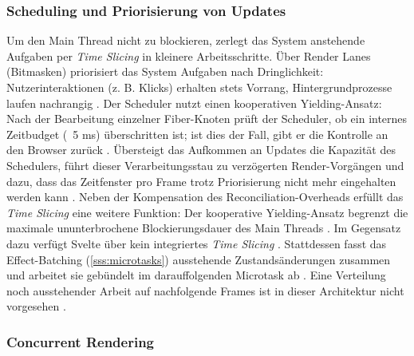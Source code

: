 \subsubsection{Scheduling und Priorisierung von Updates}
\label{sss:scheduling-priotising-of-updates}

Um den Main Thread nicht zu blockieren, zerlegt das System anstehende Aufgaben per \textit{Time Slicing} in kleinere Arbeitsschritte. Über Render Lanes (Bitmasken) priorisiert das System Aufgaben nach Dringlichkeit: Nutzerinteraktionen (z. B. Klicks) erhalten stets Vorrang, Hintergrundprozesse laufen nachrangig \cite{kumar-fluentreact-2024}. Der Scheduler nutzt einen kooperativen Yielding-Ansatz: Nach der Bearbeitung einzelner Fiber-Knoten prüft der Scheduler, ob ein internes Zeitbudget (~5 ms) überschritten ist; ist dies der Fall, gibt er die Kontrolle an den Browser zurück \cite{dev_fiber-2025}. Übersteigt das Aufkommen an Updates die Kapazität des Schedulers, führt dieser Verarbeitungsstau zu verzögerten Render-Vorgängen und dazu, dass das Zeitfenster pro Frame trotz Priorisierung nicht mehr eingehalten werden kann \cite{sitepoint_fiber-2026}. Neben der Kompensation des Reconciliation-Overheads erfüllt das \textit{Time Slicing} eine weitere Funktion: Der kooperative Yielding-Ansatz begrenzt die maximale ununterbrochene Blockierungsdauer des Main Threads \cite{github-reactfiber-2016, react_concurrentrendering-2022}. Im Gegensatz dazu verfügt Svelte über kein integriertes \textit{Time Slicing} \cite{github-reactfiber-2016, medium-microtasks-2021}. Stattdessen fasst das Effect-Batching (\cref{sss:microtasks}) ausstehende Zustandsänderungen zusammen und arbeitet sie gebündelt im darauffolgenden Microtask ab \cite{svelte-effect}. Eine Verteilung noch ausstehender Arbeit auf nachfolgende Frames ist in dieser Architektur nicht vorgesehen \cite{medium-microtasks-2021, github-reactfiber-2016}.


\subsubsection{Concurrent Rendering}
\label{sss:concurrent-rendering}

